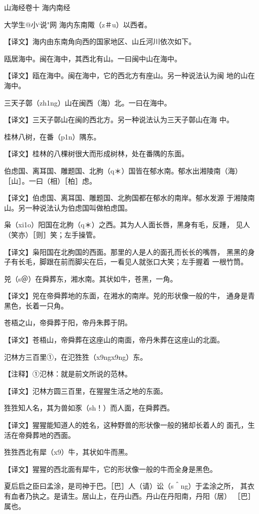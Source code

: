 \documentclass[a4paper,12pt,UTF8,twoside]{ctexbook}
\begin{document}
山海经卷十 海内南经

大$学$生@小`说"网
海内东南陬（z＃u）以西者。

【译文】海内由东南角向西的国家地区、山丘河川依次如下。

瓯居海中。闽在海中，其西北有山。一曰闽中山在海中。

【译文】瓯在海中。闽在海中，它的西北方有座山。另一种说法认为闽 地的山在海中。

三天子鄣（zh1ng）山在闽西（海）北。一曰在海中。

【译文】三天子鄣山在闽的西北方。另一种说法认为三天子鄣山在海 中。

桂林八树，在番（p1n）隅东。

【译文】桂林的八棵树很大而形成树林，处在番隅的东面。

伯虑国、离耳国、雕题国、北朐（q＊）国皆在郁水南。郁水出湘陵南（海） ［山］。一曰（相）［柏］虑。

【译文】伯虑国、离耳国、雕题国、北朐国都在郁水的南岸。郁水发源 于湘陵南山。另一种说法认为伯虑国叫做柏虑国。

枭（xi1o）阳国在北朐（q＊）之西。其为人人面长唇，黑身有毛，反踵， 见人（笑亦）［则］笑；左手操管。

【译文】枭阳国在北朐国的西面。那里的人是人的面孔而长长的嘴唇， 黑黑的身子有长毛，脚跟在前而脚尖在后，一看见人就张口大笑；左手握着 一根竹筒。

兕（s＠）在舜葬东，湘水南。其状如牛，苍黑，一角。

【译文】兕在帝舜葬地的东面，在湘水的南岸。兕的形状像一般的牛， 通身是青黑色，长着一只角。

苍梧之山，帝舜葬于阳，帝丹朱葬于阴。

【译文】苍梧山，帝舜葬在这座山的南面，帝丹朱葬在这座山的北面。

氾林方三百里①，在氾狌狌（x9ngx9ng）东。

【注释】①氾林：就是前文所说的范林。

【译文】氾林方圆三百里，在猩猩生活之地的东面。

狌狌知人名，其为兽如豕（sh！）而人面，在舜葬西。

【译文】猩猩能知道人的姓名，这种野兽的形状像一般的猪却长着人的 面孔，生活在帝舜葬地的西面。

狌狌西北有犀（x9）牛，其状如牛而黑。

【译文】猩猩的西北面有犀牛，它的形状像一般的牛而全身是黑色。

夏后启之臣曰孟涂，是司神于巴。［巴］人（请）讼（s＾ng）于孟涂之所， 其衣有血者乃执之。是请生。居山上，在丹山西。丹山在丹阳南，丹阳（居） ［巴］　属也。
\end{document}
